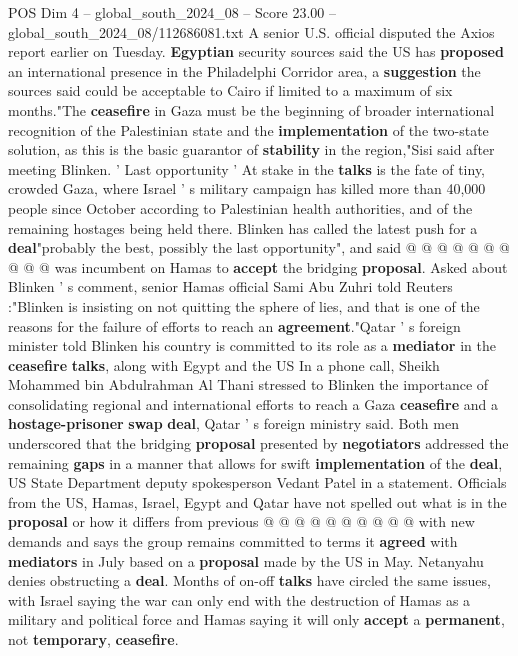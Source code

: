 \begin{textsample}{POS Dim 4 – global\_south\_2024\_08 – Score 23.00 – global\_south\_2024\_08/112686081.txt}
A senior U.S. official disputed the Axios report earlier on Tuesday. \textbf{Egyptian} security sources said the US has \textbf{proposed} an international presence in the Philadelphi Corridor area, a \textbf{suggestion} the sources said could be acceptable to Cairo if limited to a maximum of six months."The \textbf{ceasefire} in Gaza must be the beginning of broader international recognition of the Palestinian state and the \textbf{implementation} of the two-state solution, as this is the basic guarantor of \textbf{stability} in the region,"Sisi said after meeting Blinken. ' Last opportunity ' At stake in the \textbf{talks} is the fate of tiny, crowded Gaza, where Israel ' s military campaign has killed more than 40,000 people since October according to Palestinian health authorities, and of the remaining hostages being held there.
Blinken has called the latest push for a \textbf{deal}"probably the best, possibly the last opportunity", and said @ @ @ @ @ @ @ @ @ @ was incumbent on Hamas to \textbf{accept} the bridging \textbf{proposal}.
Asked about Blinken ' s comment, senior Hamas official Sami Abu Zuhri told Reuters :"Blinken is insisting on not quitting the sphere of lies, and that is one of the reasons for the failure of efforts to reach an \textbf{agreement}."Qatar ' s foreign minister told Blinken his country is committed to its role as a \textbf{mediator} in the \textbf{ceasefire} \textbf{talks}, along with Egypt and the US In a phone call, Sheikh Mohammed bin Abdulrahman Al Thani stressed to Blinken the importance of consolidating regional and international efforts to reach a Gaza \textbf{ceasefire} and a \textbf{hostage-prisoner} \textbf{swap} \textbf{deal}, Qatar ' s foreign ministry said.
Both men underscored that the bridging \textbf{proposal} presented by \textbf{negotiators} addressed the remaining \textbf{gaps} in a manner that allows for swift \textbf{implementation} of the \textbf{deal}, US State Department deputy spokesperson Vedant Patel in a statement.
Officials from the US, Hamas, Israel, Egypt and Qatar have not spelled out what is in the \textbf{proposal} or how it differs from previous @ @ @ @ @ @ @ @ @ @ with new demands and says the group remains committed to terms it \textbf{agreed} with \textbf{mediators} in July based on a \textbf{proposal} made by the US in May.
Netanyahu denies obstructing a \textbf{deal}.
Months of on-off \textbf{talks} have circled the same issues, with Israel saying the war can only end with the destruction of Hamas as a military and political force and Hamas saying it will only \textbf{accept} a \textbf{permanent}, not \textbf{temporary}, \textbf{ceasefire}.

\end{textsample}
